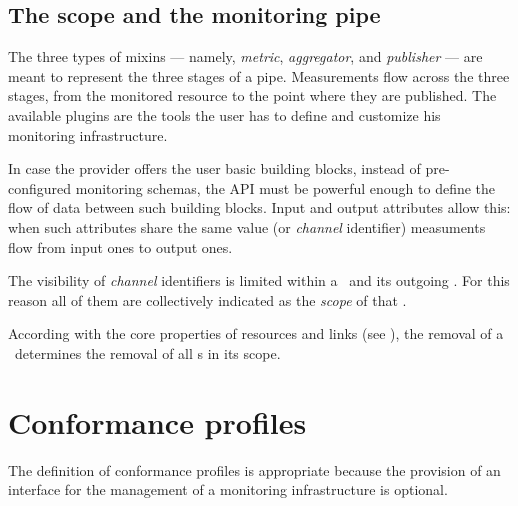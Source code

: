 \documentclass[10pt,a4paper]{article}
\begin{document}
\subsection{The scope and the monitoring pipe \label{sec:channel}}

The three types of mixins --- namely, {\em metric}, {\em aggregator}, and {\em publisher} --- are meant to represent the three stages of a pipe. Measurements flow across the three stages, from the monitored resource to the point where they are published. The available plugins are the tools the user has to define and customize his monitoring infrastructure.

In case the provider offers the user basic building blocks, instead of pre-configured monitoring schemas, the API must be powerful enough to define the flow of data between such building blocks. Input and output attributes allow this: when such attributes share the same value (or {\em channel} identifier) measuments flow from input ones to output ones.

The visibility of {\em channel} identifiers is limited within a \sens\ and its outgoing \coll. For this reason all of them are collectively indicated as the {\em scope} of that \sens .

According with the core properties of resources and links (see \cite{occi:core}), the removal of a \sens\ determines the removal of all \coll s in its scope.

\section{Conformance profiles}

The definition of conformance profiles is appropriate because the provision of an interface for the management of a monitoring infrastructure is optional. 
\end{document}
